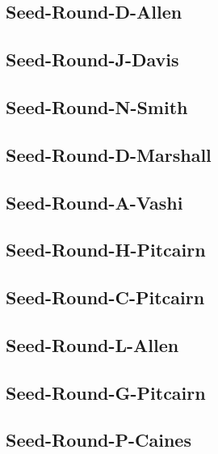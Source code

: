 \documentclass[letterpaper,10pt,openany,oneside,english]{sphinxmanual}
\begin{document}
\subsection{Seed-Round-D-Allen}
\label{\detokenize{statements:seed-round-d-allen}}

\subsection{Seed-Round-J-Davis}
\label{\detokenize{statements:seed-round-j-davis}}

\subsection{Seed-Round-N-Smith}
\label{\detokenize{statements:seed-round-n-smith}}

\subsection{Seed-Round-D-Marshall}
\label{\detokenize{statements:seed-round-d-marshall}}

\subsection{Seed-Round-A-Vashi}
\label{\detokenize{statements:seed-round-a-vashi}}

\subsection{Seed-Round-H-Pitcairn}
\label{\detokenize{statements:seed-round-h-pitcairn}}

\subsection{Seed-Round-C-Pitcairn}
\label{\detokenize{statements:seed-round-c-pitcairn}}

\subsection{Seed-Round-L-Allen}
\label{\detokenize{statements:seed-round-l-allen}}

\subsection{Seed-Round-G-Pitcairn}
\label{\detokenize{statements:seed-round-g-pitcairn}}

\subsection{Seed-Round-P-Caines}
\label{\detokenize{statements:seed-round-p-caines}}
\end{document}
